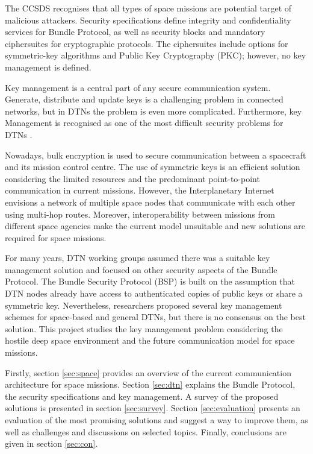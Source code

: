 The CCSDS recognises that all types of space missions are potential target of malicious attackers.  Security specifications \cite{ietf-dtn-bibect-00,ietf-dtn-bpsec-07,rfc6257} define integrity and confidentiality services for Bundle Protocol, as well as security blocks and mandatory ciphersuites for cryptographic protocols. The ciphersuites include options for symmetric-key algorithms and Public Key Cryptography (PKC); however, no key management is defined. 

Key management is a central part of any secure communication system. Generate, distribute and update keys is a challenging problem in connected networks, but in DTNs the problem is even more complicated. Furthermore, key Management is recognised as one of the most difficult security problems for DTNs  \cite{menesidou2017cryptographic}.

Nowadays, bulk encryption is used to secure communication between a spacecraft and its mission control centre. The use of symmetric keys is an efficient solution considering the limited resources and the predominant point-to-point communication in current missions. However, the Interplanetary Internet envisions a network of multiple space nodes that communicate with each other using multi-hop routes. Moreover, interoperability between missions from different space agencies make the current model unsuitable and new solutions are required for space missions.


For many years, DTN working groups assumed there was a suitable key management solution and focused on other security aspects of the Bundle Protocol. The Bundle Security Protocol (BSP) \cite{ietf-dtn-bpsec-07} is built on the assumption that DTN nodes already have access to authenticated copies of public keys or share a symmetric key. Nevertheless, researchers proposed several key management schemes for space-based and general DTNs, but there is no consensus on the best solution. This project studies the key management problem considering the hostile deep space environment and the future communication model for space missions. 


Firstly, section \ref{sec:space} provides an overview of the current communication architecture for space missions. Section \ref{sec:dtn} explains the Bundle Protocol, the security specifications and key management. A survey of the proposed solutions is presented in section \ref{sec:survey}. Section \ref{sec:evaluation} presents an evaluation of the most promising solutions and suggest a way to improve them, as well as challenges and discussions on selected topics. Finally, conclusions are given in section \ref{sec:con}. 

